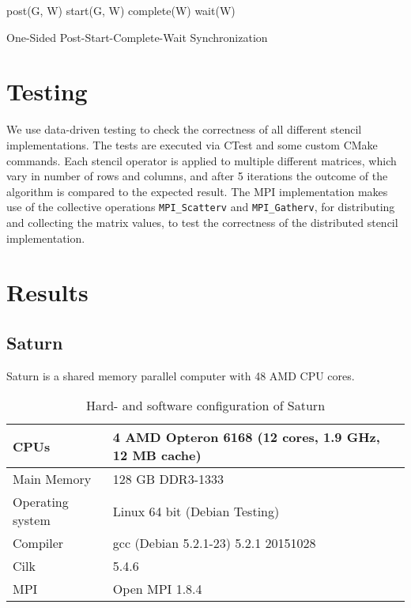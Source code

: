 \documentclass[11pt,a4paper]{article}
\begin{document}
\begin{algorithm}[H] \label{algo:mpi:onesided:pscw}
 post(G, W)\;
 start(G, W)\;
 complete(W)\;
 wait(W)\;
 \caption{One-Sided Post-Start-Complete-Wait Synchronization}
\end{algorithm}

\section{Testing}
We use data-driven testing to check the correctness of all different stencil implementations. The tests are executed via CTest and some custom CMake commands. Each stencil operator is applied to multiple different matrices, which vary in number of rows and columns, and after 5 iterations the outcome of the algorithm is compared to the expected result. The MPI implementation makes use of the collective operations \verb|MPI_Scatterv| and \verb|MPI_Gatherv|, for distributing and collecting the matrix values, to test the correctness of the distributed stencil implementation.

\section{Results}

\subsection{Saturn}
Saturn is a shared memory parallel computer with 48 AMD CPU cores.

\begin{table}[H]
  \label{tab:saturn} 
  \caption{Hard- and software configuration of Saturn}
  \begin{center}
    \begin{tabular}{|l|l|}
      \hline
      CPUs & 4 AMD Opteron 6168 (12 cores, 1.9 GHz, 12 MB cache)\\\hline
      Main Memory & 128 GB DDR3-1333\\\hline
      Operating system & Linux 64 bit (Debian Testing)\\\hline
      Compiler & gcc (Debian 5.2.1-23) 5.2.1 20151028\\\hline
      Cilk & 5.4.6\\\hline
      MPI & Open MPI 1.8.4\\\hline
    \end{tabular}
  \end{center}
\end{table}
\end{document}
